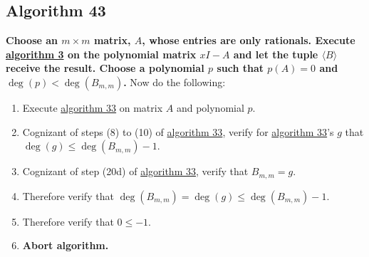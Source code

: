 \documentclass[twocolumn]{article}
\begin{document}
		\subsection{Algorithm 43}\label{sec:algorithm 43}
			\textbf{Choose an $m\times m$ matrix, $A$, whose entries are only rationals. Execute \hyperref[sec:algorithm 3]{algorithm 3} on the polynomial matrix $xI-A$ and let the tuple $\langle B\rangle$ receive the result. Choose a polynomial $p$ such that $p(A)=0$ and $\deg(p)<\deg(B_{m,m})$.} Now do the following:
			\begin{enumerate}
				\item Execute \hyperref[sec:algorithm 33]{algorithm 33} on matrix $A$ and polynomial $p$.
				\item Cognizant of steps (8) to (10) of \hyperref[sec:algorithm 33]{algorithm 33}, verify for \hyperref[sec:algorithm 33]{algorithm 33}'s $g$ that $\deg(g)\le\deg(B_{m,m})-1$.
				\item Cognizant of step (20d) of \hyperref[sec:algorithm 33]{algorithm 33}, verify that $B_{m,m}=g$.
				\item Therefore verify that $\deg(B_{m,m})=\deg(g)\le\deg(B_{m,m})-1$.
				\item Therefore verify that $0\le -1$.
				\item \textbf{Abort algorithm.}
			\end{enumerate}
\end{document}

